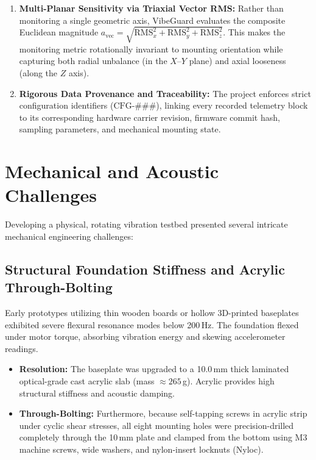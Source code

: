 \begin{enumerate}
    \item \textbf{Multi-Planar Sensitivity via Triaxial Vector RMS:} Rather than monitoring a single geometric axis, VibeGuard evaluates the composite Euclidean magnitude $a_{\mathrm{vec}} = \sqrt{\mathrm{RMS}_x^2 + \mathrm{RMS}_y^2 + \mathrm{RMS}_z^2}$. This makes the monitoring metric rotationally invariant to mounting orientation while capturing both radial unbalance (in the $X\text{--}Y$ plane) and axial looseness (along the $Z$ axis).
    \item \textbf{Rigorous Data Provenance and Traceability:} The project enforces strict configuration identifiers ($\mathrm{CFG}\text{-}\#\#\#$), linking every recorded telemetry block to its corresponding hardware carrier revision, firmware commit hash, sampling parameters, and mechanical mounting state.
\end{enumerate}

\section{Mechanical and Acoustic Challenges}
Developing a physical, rotating vibration testbed presented several intricate mechanical engineering challenges:

\subsection{Structural Foundation Stiffness and Acrylic Through-Bolting}
Early prototypes utilizing thin wooden boards or hollow 3D-printed baseplates exhibited severe flexural resonance modes below 200\,Hz. The foundation flexed under motor torque, absorbing vibration energy and skewing accelerometer readings. 
\begin{itemize}
    \item \textbf{Resolution:} The baseplate was upgraded to a 10.0\,mm thick laminated optical-grade cast acrylic slab (mass $\approx 265$\,g). Acrylic provides high structural stiffness and acoustic damping.
    \item \textbf{Through-Bolting:} Furthermore, because self-tapping screws in acrylic strip under cyclic shear stresses, all eight mounting holes were precision-drilled completely through the 10\,mm plate and clamped from the bottom using M3 machine screws, wide washers, and nylon-insert locknuts (Nyloc).
\end{itemize}

